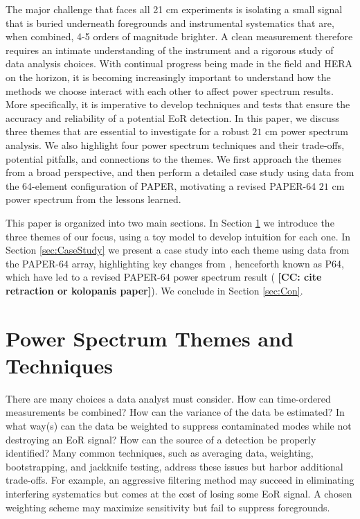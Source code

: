 \documentclass[preprint2,numberedappendix,tighten]{aastex6}  %
\newcommand{\cc}[1]{{\color{purple} \textbf{[CC: #1]}}}
\begin{document}
The major challenge that faces all 21 cm experiments is isolating a small signal that is buried underneath foregrounds and instrumental systematics that are, when combined, 4-5 orders of magnitude brighter. A clean measurement therefore requires an intimate understanding of the instrument and a rigorous study of data analysis choices. With continual progress being made in the field and HERA on the horizon, it is becoming increasingly important to understand how the methods we choose interact with each other to affect power spectrum results. More specifically, it is imperative to develop techniques and tests that ensure the accuracy and reliability of a potential EoR detection. In this paper, we discuss three themes that are essential to investigate for a robust $21$ cm power spectrum analysis. We also highlight four power spectrum techniques and their trade-offs, potential pitfalls, and connections to the themes. We first approach the themes from a broad perspective, and then perform a detailed case study using data from the 64-element configuration of PAPER, motivating a revised PAPER-64 $21$ cm power spectrum from the lessons learned.

This paper is organized into two main sections. In Section \ref{sec:Themes} we introduce the three themes of our focus, using a toy model to develop intuition for each one. In Section \ref{sec:CaseStudy} we present a case study into each theme using data from the PAPER-64 array, highlighting key changes from \citet{ali_et_al2015}, henceforth known as P64, which have led to a revised PAPER-64 power spectrum result (\cc{cite retraction or kolopanis paper}). We conclude in Section \ref{sec:Con}.


\section{Power Spectrum Themes and Techniques}
\label{sec:Themes}

There are many choices a data analyst must consider. How can time-ordered measurements be combined? How can the variance of the data be estimated? In what way(s) can the data be weighted to suppress contaminated modes while not destroying an EoR signal? How can the source of a detection be properly identified? Many common techniques, such as averaging data, weighting, bootstrapping, and jackknife testing, address these issues but harbor additional trade-offs. For example, an aggressive filtering method may succeed in eliminating interfering systematics but comes at the cost of losing some EoR signal. A chosen weighting scheme may maximize sensitivity but fail to suppress foregrounds. 
\end{document}
